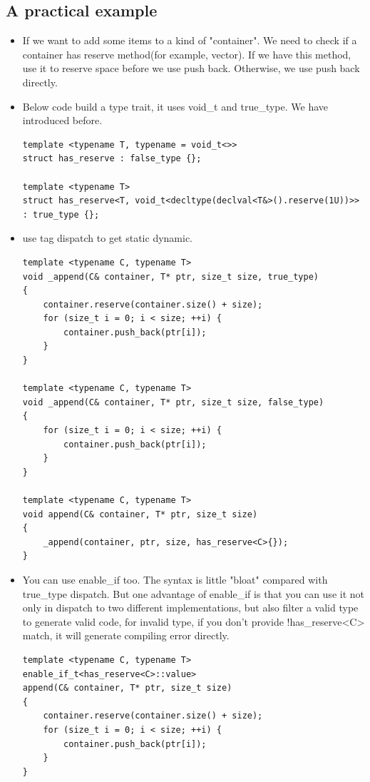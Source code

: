 \documentclass[a4paper,11pt,twoside]{book}
\begin{document}
\subsection{A practical example}
\begin{itemize}
    \item If we want to add some items to a kind of "container". We need to check if a container has reserve method(for example, vector). If we have this method, use it to reserve space before we use push back. Otherwise, we use push back directly.
    \item Below code build a type trait, it uses void\_t and true\_type. We have introduced before. 
\begin{lstlisting}
template <typename T, typename = void_t<>>
struct has_reserve : false_type {};
   
template <typename T>
struct has_reserve<T, void_t<decltype(declval<T&>().reserve(1U))>> : true_type {};   
\end{lstlisting}

    \item use tag dispatch to get static dynamic.
\begin{lstlisting}
template <typename C, typename T>
void _append(C& container, T* ptr, size_t size, true_type)  
{
    container.reserve(container.size() + size);
    for (size_t i = 0; i < size; ++i) {
        container.push_back(ptr[i]);
    }
}

template <typename C, typename T>
void _append(C& container, T* ptr, size_t size, false_type)
{
    for (size_t i = 0; i < size; ++i) {
        container.push_back(ptr[i]);
    }
}

template <typename C, typename T>
void append(C& container, T* ptr, size_t size) 
{ 
    _append(container, ptr, size, has_reserve<C>{}); 
}
\end{lstlisting}

    \item You can use enable\_if too. The syntax is little "bloat" compared with true\_type dispatch. But one advantage of enable\_if is that you can use it not only in dispatch to two different implementations, but also filter a valid type to generate valid code, for invalid type, if you don't provide !has\_reserve<C> match, it will generate compiling error directly.
\begin{lstlisting}
template <typename C, typename T>
enable_if_t<has_reserve<C>::value>
append(C& container, T* ptr, size_t size)
{
    container.reserve(container.size() + size);
    for (size_t i = 0; i < size; ++i) {
    	container.push_back(ptr[i]);
    }
}


\end{lstlisting}
\end{itemize}
\end{document}
